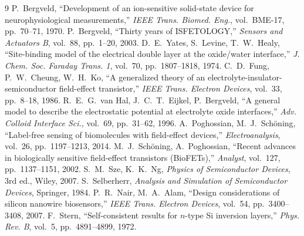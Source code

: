 \documentclass[11pt,a4paper]{article}
\begin{document}
\begin{thebibliography}{9}
\small
{} P.~Bergveld, ``Development of an ion-sensitive solid-state
device for neurophysiological measurements,'' \emph{IEEE Trans. Biomed. Eng.},
vol.~BME-17, pp.~70--71, 1970.
 P.~Bergveld, ``Thirty years of ISFETOLOGY,''
\emph{Sensors and Actuators B}, vol.~88, pp.~1--20, 2003.
 D.~E.~Yates, S.~Levine, T.~W.~Healy, ``Site-binding model of
the electrical double layer at the oxide/water interface,'' \emph{J. Chem. Soc.
Faraday Trans. 1}, vol.~70, pp.~1807--1818, 1974.
 C.~D.~Fung, P.~W.~Cheung, W.~H.~Ko, ``A generalized theory of
an electrolyte-insulator-semiconductor field-effect transistor,'' \emph{IEEE
Trans. Electron Devices}, vol.~33, pp.~8--18, 1986.
 R.~E.~G.~van Hal, J.~C.~T.~Eijkel, P.~Bergveld, ``A general
model to describe the electrostatic potential at electrolyte oxide interfaces,''
\emph{Adv. Colloid Interface Sci.}, vol.~69, pp.~31--62, 1996.
 A.~Poghossian, M.~J.~Sch\"oning, ``Label-free sensing of
biomolecules with field-effect devices,'' \emph{Electroanalysis}, vol.~26,
pp.~1197--1213, 2014.
 M.~J.~Sch\"oning, A.~Poghossian, ``Recent advances in
biologically sensitive field-effect transistors (BioFETs),'' \emph{Analyst},
vol.~127, pp.~1137--1151, 2002.
 S.~M.~Sze, K.~K.~Ng, \emph{Physics of Semiconductor Devices}, 3rd
ed., Wiley, 2007.
 S.~Selberherr, \emph{Analysis and Simulation of
Semiconductor Devices}, Springer, 1984.
 P.~R.~Nair, M.~A.~Alam, ``Design considerations of silicon
nanowire biosensors,'' \emph{IEEE Trans. Electron Devices}, vol.~54,
pp.~3400--3408, 2007.
 F.~Stern, ``Self-consistent results for $n$-type Si inversion
layers,'' \emph{Phys. Rev. B}, vol.~5, pp.~4891--4899, 1972.
\end{thebibliography}
\end{document}
